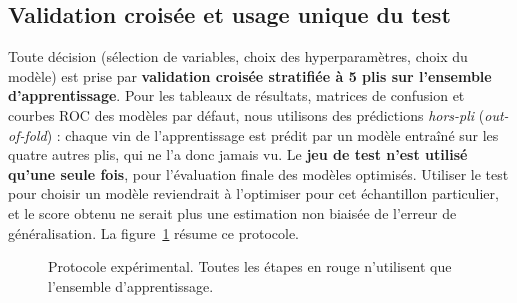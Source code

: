 \documentclass[11pt,a4paper]{article}
\begin{document}
\subsection{Validation croisée et usage unique du test}
Toute décision (sélection de variables, choix des hyperparamètres, choix du modèle) est prise par \textbf{validation croisée stratifiée à 5 plis sur l'ensemble d'apprentissage}. Pour les tableaux de résultats, matrices de confusion et courbes ROC des modèles par défaut, nous utilisons des prédictions \emph{hors-pli} (\emph{out-of-fold}) : chaque vin de l'apprentissage est prédit par un modèle entraîné sur les quatre autres plis, qui ne l'a donc jamais vu. Le \textbf{jeu de test n'est utilisé qu'une seule fois}, pour l'évaluation finale des modèles optimisés. Utiliser le test pour choisir un modèle reviendrait à l'optimiser pour cet échantillon particulier, et le score obtenu ne serait plus une estimation non biaisée de l'erreur de généralisation. La figure~\ref{fig:pipeline} résume ce protocole.

\begin{figure}[H]
\centering
{}
\caption{Protocole expérimental. Toutes les étapes en rouge n'utilisent que l'ensemble d'apprentissage.}
\label{fig:pipeline}
\end{figure}
\end{document}
